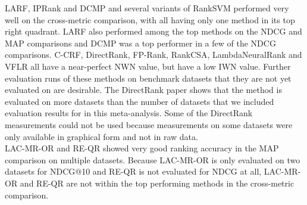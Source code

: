 \documentclass{llncs}
\begin{document}
LARF, IPRank and DCMP and several variants of RankSVM performed very well on the cross-metric comparison, with all having only one method in its top right quadrant. LARF also performed among the top methods on the NDCG and MAP comparisons and DCMP was a top performer in a few of the NDCG comparisons. C-CRF, DirectRank, FP-Rank, RankCSA, LambdaNeuralRank and VFLR all have a near-perfect NWN value, but have a low IWN value. Further evaluation runs of these methods on benchmark datasets that they are not yet evaluated on are desirable. The DirectRank paper \cite{Tan2013} shows that the method  is evaluated on more datasets than the number of datasets that we included evaluation results for in this meta-analysis. Some of the DirectRank measurements could not be used because measurements on some datasets were only available in graphical form and not in raw data.\\
LAC-MR-OR and RE-QR showed very good ranking accuracy in the MAP comparison on multiple datasets. Because LAC-MR-OR is only evaluated on two datasets for NDCG@10 and RE-QR is not evaluated for NDCG at all, LAC-MR-OR and RE-QR are not within the top performing methods in the cross-metric comparison. 
\end{document}
